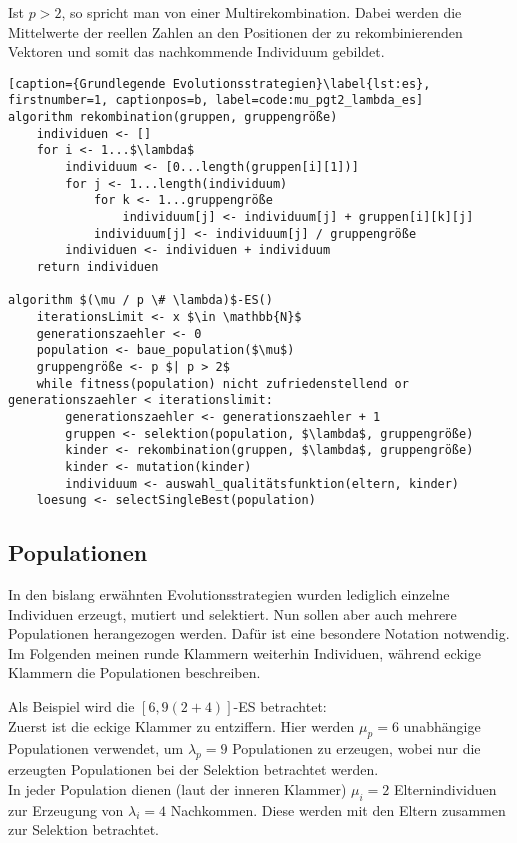 Ist $p > 2$, so spricht man von einer Multirekombination.
Dabei werden die Mittelwerte der reellen Zahlen an den Positionen der zu rekombinierenden Vektoren und somit das nachkommende Individuum gebildet.

\begin{lstlisting}[caption={Grundlegende Evolutionsstrategien}\label{lst:es}, firstnumber=1, captionpos=b, label=code:mu_pgt2_lambda_es]
algorithm rekombination(gruppen, gruppengröße)
	individuen <- []
	for i <- 1...$\lambda$
		individuum <- [0...length(gruppen[i][1])]
		for j <- 1...length(individuum)
			for k <- 1...gruppengröße
				individuum[j] <- individuum[j] + gruppen[i][k][j]
			individuum[j] <- individuum[j] / gruppengröße
		individuen <- individuen + individuum
	return individuen

algorithm $(\mu / p \# \lambda)$-ES()
	iterationsLimit <- x $\in \mathbb{N}$
	generationszaehler <- 0
	population <- baue_population($\mu$)
	gruppengröße <- p $| p > 2$
	while fitness(population) nicht zufriedenstellend or generationszaehler < iterationslimit:
		generationszaehler <- generationszaehler + 1
		gruppen <- selektion(population, $\lambda$, gruppengröße)
		kinder <- rekombination(gruppen, $\lambda$, gruppengröße)
		kinder <- mutation(kinder)
		individuum <- auswahl_qualitätsfunktion(eltern, kinder)
	loesung <- selectSingleBest(population)
\end{lstlisting}


\subsection{Populationen}

In den bislang erwähnten Evolutionsstrategien wurden lediglich einzelne Individuen erzeugt, mutiert und selektiert.
Nun sollen aber auch mehrere Populationen herangezogen werden.
Dafür ist eine besondere Notation notwendig.
Im Folgenden meinen runde Klammern weiterhin Individuen, während eckige Klammern die Populationen beschreiben.

Als Beispiel wird die $[6,9(2+4)]$-ES betrachtet:\\
Zuerst ist die eckige Klammer zu entziffern. Hier werden $\mu_p = 6$ unabhängige Populationen verwendet, um  $\lambda_p = 9$ Populationen zu erzeugen, wobei nur die erzeugten Populationen bei der Selektion betrachtet werden.\\
In jeder Population dienen (laut der inneren Klammer) $\mu_i = 2$ Elternindividuen zur Erzeugung von $\lambda_i = 4$ Nachkommen. Diese werden mit den Eltern zusammen zur Selektion betrachtet.

